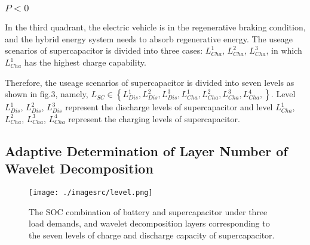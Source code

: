 \documentclass[energies,article,submit,moreauthors,pdftex,10pt,a4paper]{Definitions/mdpi}
\begin{document}
 \subsubsection{${P<0}$}
In the third quadrant, 
the electric vehicle is in the regenerative  braking condition, and the hybrid energy system needs to absorb regenerative energy.
The useage scenarios of supercapacitor is divided into three cases: $ L_{Cha}^1$, $ L_{Cha}^2$, $ L_{Cha}^3$, in which $ L_{Cha}^1$ has the highest charge capability.

Therefore, the useage scenarios of supercapacitor is divided into seven levels as shown in fig.3, namely,
${L_{SC}} \in \left\{ { L_{Dis}^1, L_{Dis}^2, L_{Dis}^3, L_{Cha}^1, L_{Cha}^2,L_{Cha}^3,L_{Cha}^4,} \right\}$.
Level $ L_{Dis}^1$, $L_{Dis}^2$, $L_{Dis}^3$ represent the discharge levels of supercapacitor and level $L_{Cha}^1$, $L_{Cha}^2$, $L_{Cha}^3$, $L_{Cha}^4$ represent the charging levels of supercapacitor.

\subsection{Adaptive Determination of Layer Number of Wavelet Decomposition}

\begin{figure*}[ht]
\centering
\texttt{[image: ./imagesrc/level.png]}
\caption{The SOC combination of battery and supercapacitor under three load demands, and wavelet decomposition layers corresponding to the seven levels of charge and discharge capacity of supercapacitor.}
\label{level}
\end{figure*}


\end{document}
